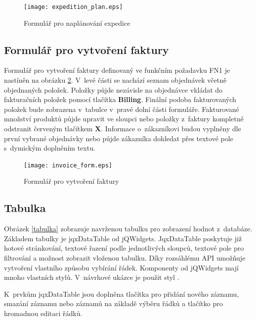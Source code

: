 \documentclass[thesis=B,czech]{FITthesis}[2012/06/26]
\begin{document}
\begin{figure}
	\texttt{[image: expedition\_plan.eps]}
	\caption{Formulář pro naplánování expedice}\label{expedice}
\end{figure}

\subsection{Formulář pro vytvoření faktury}
	Formulář pro vytvoření faktury definovaný ve funkčním požadavku FN1 je nastíněn na obrázku \ref{faktura}. V~levé části se nachází seznam objednávek včetně objednaných položek. Položky půjde nezávisle na objednávce vkládat do fakturačních položek pomocí tlačítka \textbf{Billing}. Finální podoba fakturovaných položek bude zobrazena v~tabulce v~pravé dolní části formuláře. Fakturované množství produktů půjde upravit ve sloupci  nebo položky z~faktury kompletně odstranit červeným tlačítkem \textbf{X}. Informace o~zákazníkovi budou vyplněny dle první vybrané objednávky nebo půjde zákazníka dohledat přes textové pole s~dymickým doplněním textu.

\begin{figure}
	\texttt{[image: invoice\_form.eps]}
	\caption{Formulář pro vytvoření faktury}\label{faktura}
\end{figure}

\subsection{Tabulka}
	Obrázek \ref{tabulka} zobrazuje navrženou tabulku pro zobrazení hodnot z~databáze. Základem tabulky je jqxDataTable\cite{jqx_dataTable} od jQWidgets. JqxDataTable poskytuje již hotové stránkování, textové řazení podle jednotlivých sloupců, textové pole pro filtrování a možnost zobrazit vloženou tabulku. Díky rozsáhlému API umožňuje vytvoření vlastního způsobu vybírání řádek. Komponenty od jQWidgets mají mnoho vlastních stylů. V~návrhové ukázce je použit styl .
	
	K~prvkům jqxDataTable jsou doplněna tlačítka pro přidání nového záznamu, smazání záznamu nebo záznamů na základě výběru řádků a tlačítko pro hromadnou editaci řádků.
\end{document}
